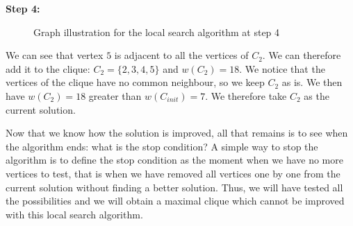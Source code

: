 \begin{minipage}{\linewidth}
    \textbf{Step 4:} \newline
    
    \begin{minipage}{0.4\textwidth}
        \begin{figure}[H]
            \centering
            \caption{Graph illustration for the local search algorithm at step 4}
            \label{fig:local-search-mewc-neighbour-4}
        \end{figure}
    \end{minipage}
    \begin{minipage}{0.6\textwidth}
        We can see that vertex $5$ is adjacent to all the vertices of $C_2$. We can 
        therefore add it to the clique: $C_2 = \{2, 3, 4, 5\}$ and $w(C_2) = 18$. We 
        notice that the vertices of the clique have no common neighbour, so we keep 
        $C_2$ as is. We then have $w(C_2) = 18$ greater than $w(C_{init}) = 7$. We 
        therefore take $C_2$ as the current solution.
    \end{minipage}
\end{minipage}

\bigskip

Now that we know how the solution is improved, all that remains is to see when the algorithm 
ends: what is the stop condition? A simple way to stop the algorithm is to define the stop 
condition as the moment when we have no more vertices to test, that is when we have removed 
all vertices one by one from the current solution without finding a better solution. Thus, 
we will have tested all the possibilities and we will obtain a maximal clique which cannot 
be improved with this local search algorithm.